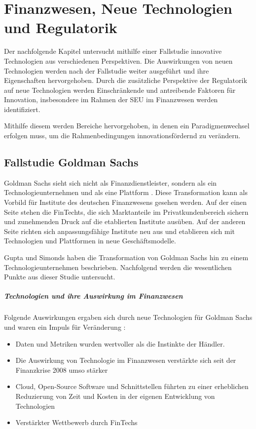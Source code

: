 \chapter{Finanzwesen, Neue Technologien und Regulatorik}
\label{ch:background}
Der nachfolgende Kapitel untersucht mithilfe einer Fallstudie innovative Technologien aus verschiedenen Perspektiven. Die Auswirkungen von neuen Technologien werden nach der Fallstudie weiter ausgeführt und ihre Eigenschaften hervorgehoben. Durch die zusätzliche Perspektive der Regulatorik auf neue Technologien werden Einschränkende und antreibende Faktoren für Innovation, insbesondere im Rahmen der \ac{SEU} im Finanzwesen werden identifiziert.

Mithilfe diesem werden Bereiche hervorgehoben, in denen ein Paradigmenwechsel erfolgen muss, um die Rahmenbedingungen innovationsfördernd zu verändern.

\section{Fallstudie Goldman Sachs}
\label{section:Goldman}
Goldman Sachs sieht sich nicht als Finanzdienstleister, sondern als ein Technologieunternehmen und als eine Plattform \cite{Gupta:2017}. Diese Transformation kann als Vorbild für Institute des deutschen Finanzwesens gesehen werden. Auf der einen Seite stehen die FinTechts, die sich Marktanteile im Privatkundenbereich sichern und zunehmenden Druck auf die etablierten Institute ausüben. Auf der anderen Seite richten sich anpassungsfähige Institute neu aus und etablieren sich mit Technologien und Plattformen in neue Geschäftsmodelle. 

Gupta und Simonds \cite{Gupta:2017} haben die Transformation von Goldman Sachs hin zu einem Technologieunternehmen beschrieben. Nachfolgend werden die wesentlichen Punkte aus dieser Studie untersucht.
%
\paragraph{Technologien und ihre Auswirkung im Finanzwesen}
Folgende Auswirkungen ergaben sich durch neue Technologien für Goldman Sachs und waren ein Impuls für Veränderung \cite{Gupta:2017}:
\begin{itemize}
    \item Daten und Metriken wurden wertvoller als die Instinkte der Händler.
    \item Die Auswirkung von Technologie im Finanzwesen verstärkte sich seit der Finanzkrise 2008 umso stärker
    \item Cloud, Open-Source Software und Schnittstellen führten zu einer erheblichen Reduzierung von Zeit und Kosten in der eigenen Entwicklung von Technologien
    \item Verstärkter Wettbewerb durch FinTechs
\end{itemize}


